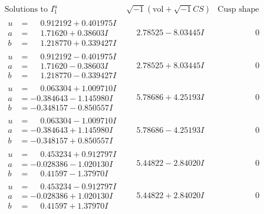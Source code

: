 \documentclass[1p]{elsarticle_modified}
\theoremstyle{definition}
\newcommand{\I}{\sqrt{-1}}
\begin{document}
$$\begin{array}{c|c|c}  
\text{Solutions to }I^u_{1}& \I (\text{vol} + \sqrt{-1}CS) & \text{Cusp shape}\\
 \hline 
\begin{aligned}
u &= \phantom{-}0.912192 + 0.401975 I \\
a &= \phantom{-}1.71620 + 0.38603 I \\
b &= \phantom{-}1.218770 + 0.339427 I\end{aligned}
 & \phantom{-}2.78525 - 8.03445 I & \phantom{-0.000000 } 0 \\ \hline\begin{aligned}
u &= \phantom{-}0.912192 - 0.401975 I \\
a &= \phantom{-}1.71620 - 0.38603 I \\
b &= \phantom{-}1.218770 - 0.339427 I\end{aligned}
 & \phantom{-}2.78525 + 8.03445 I & \phantom{-0.000000 } 0 \\ \hline\begin{aligned}
u &= \phantom{-}0.063304 + 1.009710 I \\
a &= -0.384643 - 1.145980 I \\
b &= -0.348157 - 0.850557 I\end{aligned}
 & \phantom{-}5.78686 + 4.25193 I & \phantom{-0.000000 } 0 \\ \hline\begin{aligned}
u &= \phantom{-}0.063304 - 1.009710 I \\
a &= -0.384643 + 1.145980 I \\
b &= -0.348157 + 0.850557 I\end{aligned}
 & \phantom{-}5.78686 - 4.25193 I & \phantom{-0.000000 } 0 \\ \hline\begin{aligned}
u &= \phantom{-}0.453234 + 0.912797 I \\
a &= -0.028386 - 1.020130 I \\
b &= \phantom{-}0.41597 - 1.37970 I\end{aligned}
 & \phantom{-}5.44822 - 2.84020 I & \phantom{-0.000000 } 0 \\ \hline\begin{aligned}
u &= \phantom{-}0.453234 - 0.912797 I \\
a &= -0.028386 + 1.020130 I \\
b &= \phantom{-}0.41597 + 1.37970 I\end{aligned}
 & \phantom{-}5.44822 + 2.84020 I & \phantom{-0.000000 } 0 \\ \hline\begin{aligned}

\end{aligned}
\end{array}$$
\end{document}
